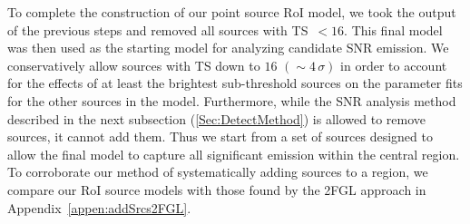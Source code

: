 

To complete the construction of our point source RoI model, we took the output of the previous steps and removed all sources with TS~$< 16$. This final model was then used as the starting model for analyzing candidate SNR emission. We conservatively allow sources with TS down to $16$ $(\sim4\,\sigma)$ in order to account for the effects of at least the brightest sub-threshold sources on the parameter fits for the other sources in the model. Furthermore, while the SNR analysis method described in the next subsection (\ref{Sec:DetectMethod}) is allowed to remove sources, it cannot add them. Thus we start from a set of sources designed to allow the final model to capture all significant emission within the central region. To corroborate our method of systematically adding sources to a region, we compare our RoI source models with those found by the 2FGL approach in Appendix~\ref{appen:addSrcs2FGL}. 


